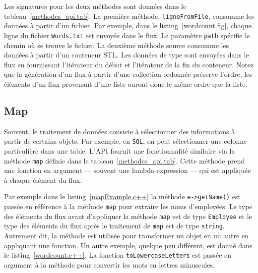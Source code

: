 Les signatures pour les deux m\'ethodes sont donn\'ees dans le tableau~\ref{methodes_api.tab}. La premi\`ere m\'ethode, \texttt{ligneFromFile}, consomme les donn\'ees \`a partir d'un fichier.  Par exemple, dans le listing~\ref{wordcount.fig}, chaque ligne du fichier \texttt{Words.txt} est envoy\'ee dans le flux. Le param\`etre \texttt{path} sp\'ecifie le chemin o\`u se trouve le fichier. La deuxi\`eme m\'ethode source consomme les donn\'ees \`a partir d'un conteneur STL. Les donn\'ees de type  sont envoy\'ees dans le flux en fournissant l'it\'erateur du d\'ebut et l'it\'erateur de la fin du conteneur. Notez que la g\'en\'eration d'un flux \`a partir d'une collection ordonn\'ee pr\'eserve l'ordre; les \'el\'ements d'un flux provenant d'une liste auront donc le m\^eme ordre que la liste.


\subsection{Map}



Souvent, le traitement de donn\'ees consiste \`a s\'electionner des informations \`a partir de certains objets. Par exemple, en \texttt{SQL}, on peut s\'electionner une colonne particuli\`ere dans une table. L'API fournit une fonctionnalit\'e similaire via la m\'ethode \texttt{map} d\'efinie dans le tableau~\ref{methodes_api.tab}. Cette m\'ethode prend une fonction en argument --- souvent une lambda-expression --- qui est appliqu\'ee \`a chaque \'el\'ement du flux. 

Par exemple dans le listing~\ref{mapExample.c++} la m\'ethode \texttt{e->getName()} est pass\'ee en r\'ef\'erence \`a la m\'ethode \texttt{map} pour extraire  les noms d'employ\'ees. Le type des \'el\'ements du flux avant d'appliquer la m\'ethode \texttt{map} est de type \texttt{Employee} et le type des \'el\'ements du flux apr\`es le traitement de \texttt{map} est de type \texttt{string}. Autrement dit, la m\'ethode  est utilis\'ee pour transformer un objet en un autre en appliquant une fonction. Un autre exemple, quelque peu diff\'erent, est donn\'e dans le listing~\ref{wordcount.c++}. La fonction \texttt{toLowercaseLetters} est pass\'ee en argument \`a la m\'ethode  pour convertir les mots en lettres minuscules. 

